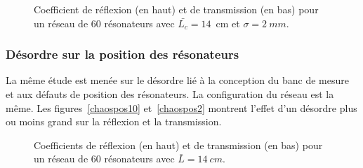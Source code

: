 \begin{figure}[!h]
\begin{minipage}{0.45 \textwidth}
		\caption{\label{chaos2} Coefficient de réflexion (en haut) et de transmission (en bas) pour un réseau de 60 résonateurs avec $\bar{L_c}=14$~cm et $\sigma=2~mm$.}
	\end{minipage}
\end{figure}



\subsubsection{Désordre sur la position des résonateurs}
La même étude est menée sur le désordre lié à la conception du banc de mesure et aux défauts de position des résonateurs. La configuration du réseau est la même.
Les figures~\ref{chaospos10} et~\ref{chaospos2} montrent l'effet d'un désordre plus ou moins grand sur la réflexion et la transmission.

\begin{figure}[h!]
	\caption{Coefficients de réflexion (en haut) et de transmission (en bas) pour un réseau de 60 résonateurs avec $\bar{L}=14~cm$.}
\end{figure}

